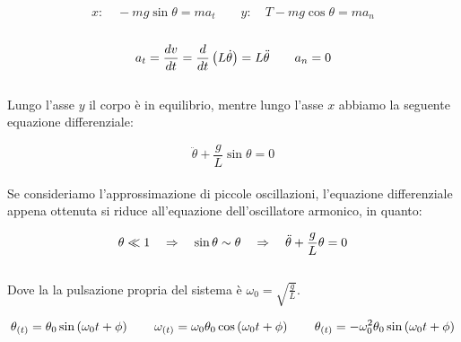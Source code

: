 \begin{equation}
    x:\quad -mg\sin\theta = ma_t\quad\quad y:\quad T-mg\cos\theta = ma_n
\end{equation}
\\
\begin{equation}
    a_t = \frac{dv}{dt}=\frac d{dt}\left( L\dot\theta\right)=
    L\ddot\theta\quad\quad a_n = 0
\end{equation}
\\
Lungo l'asse $y$ il corpo è in equilibrio, mentre lungo l'asse $x$ abbiamo
la seguente equazione differenziale:

\begin{equation}
    \boxed{\ddot\theta + \frac gL\sin\theta = 0}
\label{eq:pendulum_DE}
\end{equation}
\\
Se consideriamo l'approssimazione di piccole oscillazioni, l'equazione
differenziale appena ottenuta si riduce all'equazione dell'oscillatore
armonico, in quanto:

\begin{equation}
    \theta \ll 1 \quad\Rightarrow\quad \sin\theta \sim \theta \quad\Rightarrow\quad
    \ddot\theta + \frac gL\theta = 0
\label{eq:pendulum_ODE}
\end{equation}
\\
Dove la la pulsazione propria del sistema è $\omega_0 = \sqrt{\frac gL}$.

\begin{equation}
    \theta_{(t)} = \theta_0\sin\left(\omega_0t+\phi\right)\quad\quad
    \omega_{(t)} = \omega_0\theta_0\cos\left(\omega_0t+\phi\right)\quad\quad
    \theta_{(t)} =-\omega_0^2 \theta_0\sin\left(\omega_0t+\phi\right)
\end{equation}